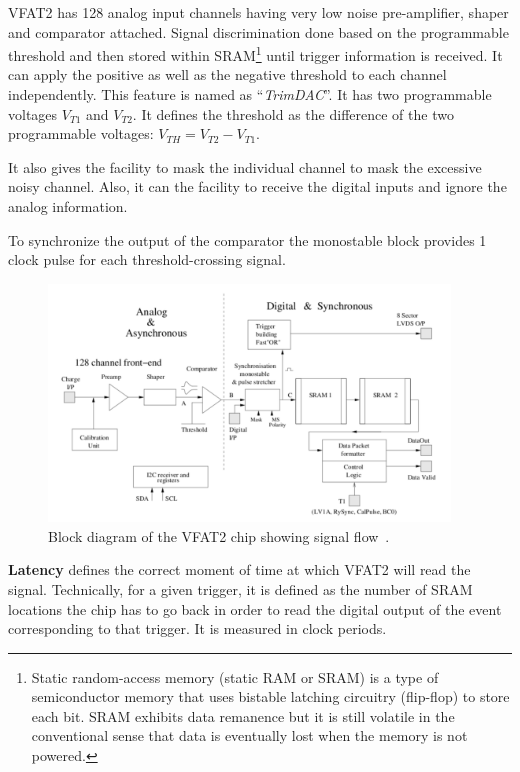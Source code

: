 VFAT2 has 128 analog input channels having very low noise pre-amplifier, shaper and comparator attached. 
Signal discrimination done based on the programmable threshold and then stored within SRAM\footnote{Static random-access memory (static RAM or SRAM) is a type of semiconductor memory that uses bistable latching circuitry (flip-flop) to store each bit. SRAM exhibits data remanence but it is still volatile in the conventional sense that data is eventually lost when the memory is not powered.} until trigger information is received. 
It can apply the positive as well as the negative threshold to each channel independently. 
This feature is named as ``\textit{TrimDAC}''.
It has two programmable voltages $V_{T1}$ and $V_{T2}$. It defines the threshold as the difference of the two programmable voltages: $V_{TH} = V_{T2} - V_{T1}$.

It also gives the facility to mask the individual channel to mask the excessive noisy channel. Also, it can the facility to receive the digital inputs and ignore the analog information.

To synchronize the output of the comparator the monostable block provides 1 clock pulse for each threshold-crossing signal.

\begin{figure}[htbp]
    \centering
    \includegraphics[width=0.95\textwidth]{figures/GEM/VFAT2_chip_BlockDiagram.png}
    \caption{Block diagram of the VFAT2 chip showing signal flow~\cite{Aspell2007}.}
    \label{fig:VFAT2block}
\end{figure}



\textbf{Latency} defines the correct moment of time at which VFAT2 will read the signal. Technically, for a given trigger, it is defined as the number of SRAM locations the chip has to go back in order to read the digital output of the event corresponding to that trigger. It is measured in clock periods. 

